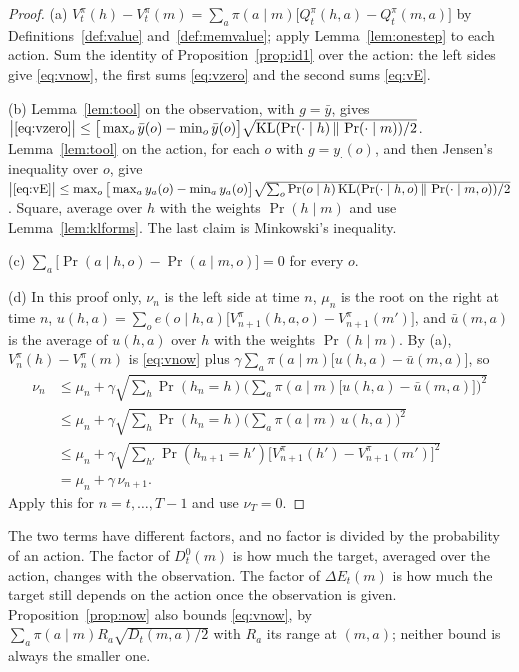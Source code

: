 \documentclass{article}
\theoremstyle{definition}
\newcommand{\KL}{\mathrm{KL}}
\newcommand{\dE}{\Delta E}
\newcommand{\why}[1]{\tag*{\small(#1)}}
\begin{document}
\begin{proof}
(a) $V^\pi_t(h)-V^\pi_t(m)=\sum_a\pi(a\mid m)\big[Q^\pi_t(h,a)-Q^\pi_t(m,a)\big]$ by Definitions~\ref{def:value} and~\ref{def:memvalue}; apply Lemma~\ref{lem:onestep} to each action. Sum the identity of Proposition~\ref{prop:id1} over the action: the left sides give \eqref{eq:vnow}, the first sums \eqref{eq:vzero} and the second sums \eqref{eq:vE}.

(b) Lemma~\ref{lem:tool} on the observation, with $g=\bar y$, gives $\big|\eqref{eq:vzero}\big|\le\big[\max_o\bar y(o)-\min_o\bar y(o)\big]\sqrt{\KL(\Pr(\cdot\mid h)\,\|\,\Pr(\cdot\mid m))/2}$. Lemma~\ref{lem:tool} on the action, for each $o$ with $g=y_\cdot(o)$, and then Jensen's inequality over $o$, give $\big|\eqref{eq:vE}\big|\le\max_o\big[\max_ay_a(o)-\min_ay_a(o)\big]\sqrt{\sum_o\Pr(o\mid h)\,\KL(\Pr(\cdot\mid h,o)\,\|\,\Pr(\cdot\mid m,o))/2}$. Square, average over $h$ with the weights $\Pr(h\mid m)$ and use Lemma~\ref{lem:klforms}. The last claim is Minkowski's inequality.

(c) $\sum_a\big[\Pr(a\mid h,o)-\Pr(a\mid m,o)\big]=0$ for every $o$.

(d) In this proof only, $\nu_n$ is the left side at time $n$, $\mu_n$ is the root on the right at time $n$, $u(h,a)=\sum_oe(o\mid h,a)\big[V^\pi_{n+1}(h,a,o)-V^\pi_{n+1}(m')\big]$, and $\bar u(m,a)$ is the average of $u(h,a)$ over $h$ with the weights $\Pr(h\mid m)$. By (a), $V^\pi_n(h)-V^\pi_n(m)$ is \eqref{eq:vnow} plus $\gamma\sum_a\pi(a\mid m)\big[u(h,a)-\bar u(m,a)\big]$, so
\begin{align*}
\nu_n&\le\mu_n+\gamma\sqrt{\sum_h\Pr(h_n=h)\Big(\sum_a\pi(a\mid m)\big[u(h,a)-\bar u(m,a)\big]\Big)^2} \why{Minkowski's inequality}\\
&\le\mu_n+\gamma\sqrt{\sum_h\Pr(h_n=h)\Big(\sum_a\pi(a\mid m)\,u(h,a)\Big)^2} \why{subtracting the average over $h$ given $m$ does not increase the average square}\\
&\le\mu_n+\gamma\sqrt{\sum_{h'}\Pr(h_{n+1}=h')\big[V^\pi_{n+1}(h')-V^\pi_{n+1}(m')\big]^2} \why{Jensen's inequality; $h'=(h,a,o)$}\\
&=\mu_n+\gamma\,\nu_{n+1}.
\end{align*}
Apply this for $n=t,\dots,T-1$ and use $\nu_T=0$.
\end{proof}

The two terms have different factors, and no factor is divided by the probability of an action. The factor of $D^0_t(m)$ is how much the target, averaged over the action, changes with the observation. The factor of $\dE_t(m)$ is how much the target still depends on the action once the observation is given. Proposition~\ref{prop:now} also bounds \eqref{eq:vnow}, by $\sum_a\pi(a\mid m)R_a\sqrt{D_t(m,a)/2}$ with $R_a$ its range at $(m,a)$; neither bound is always the smaller one.
\end{document}
